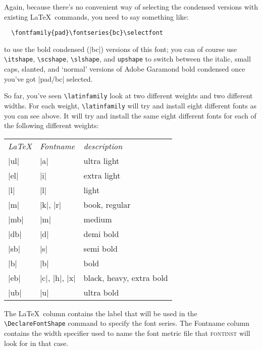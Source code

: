 \documentclass[a4paper]{ltxguide}
\newcommand*{\setpackagename}[1]{\textsc{#1}}
\newcommand{\fontinst}{\setpackagename{font\-inst}\xspace}
\newcommand{\Fontnamekb}{Fontname\xspace}
\begin{document}
Again, because there's no convenient way of selecting the condensed
versions with existing \LaTeX\ commands, you need to say something
like:
\begin{verbatim}
  \fontfamily{pad}\fontseries{bc}\selectfont
\end{verbatim}
to use the bold condensed (|bc|) versions of this font; you can of
course use \verb|\itshape|, \verb|\scshape|, \verb|\slshape|, and
\verb|upshape| to switch between the italic, small caps, slanted, and
`normal' versions of Adobe Garamond bold condensed once you've got
|pad/bc| selected.

So far, you've seen \verb|\latinfamily| look at two different weights
and two different widths.  For each weight, \verb|\latinfamily| will
try and install eight different fonts as you can see above.  It will
try and install the same eight different fonts for each of the
following different weights:
\begin{center}
\begin{tabular}{lll}
  \emph{\LaTeX} & \emph{Fontname} & \emph{description} \\
  |ul|     & |a|           & ultra light  \\
  |el|     & |i|           & extra light  \\
  |l|      & |l|           & light        \\
  |m|      & |k|, |r|      & book, regular \\
  |mb|     & |m|           & medium       \\
  |db|     & |d|           & demi bold    \\
  |sb|     & |s|           & semi bold    \\
  |b|      & |b|           & bold         \\
  |eb|     & |c|, |h|, |x| & black, heavy, extra bold \\
  |ub|     & |u|           & ultra bold
\end{tabular}
\end{center}
The \LaTeX\ column contains the label that will be used in the
\verb|\DeclareFontShape| command to specify the font series.  The
\Fontnamekb column contains the width specifier used to name the font
metric file that \fontinst will look for in that case.
\end{document}
